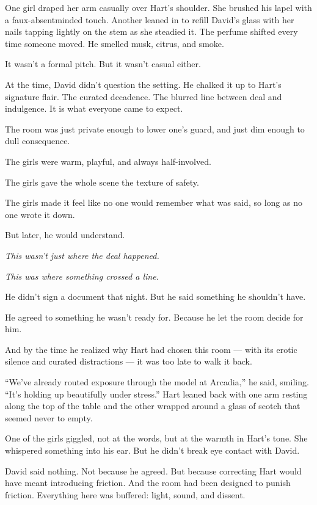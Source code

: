 \medskip


One girl draped her arm casually over Hart’s shoulder. She brushed his lapel with a faux-absentminded touch.  
Another leaned in to refill David’s glass with her nails tapping lightly on the stem as she steadied it.  
The perfume shifted every time someone moved. He smelled musk, citrus, and smoke.  

It wasn’t a formal pitch. But it wasn’t casual either.

At the time, David didn’t question the setting.  
He chalked it up to Hart’s signature flair. The curated decadence. The blurred line between deal and indulgence.
It is what everyone came to expect.  

The room was just private enough to lower one’s guard, and just dim enough to dull consequence.  

The girls were warm, playful, and always half-involved. 

The girls gave the whole scene the texture of safety.  

The girls made it feel like no one would remember what was said, so long as no one wrote it down.

But later, he would understand.

\textit{This wasn’t just where the deal happened.}  

\textit{This was where something crossed a line.}

He didn’t sign a document that night.  
But he said something he shouldn’t have.  

He agreed to something he wasn’t ready for.  
Because he let the room decide for him.

And by the time he realized why Hart had chosen this room —  
with its erotic silence and curated distractions —  
it was too late to walk it back.

“We’ve already routed exposure through the model at Arcadia,” he said, smiling. 
“It’s holding up beautifully under stress.”
Hart leaned back with one arm resting along the top of the table and the other wrapped around a 
glass of scotch that seemed never to empty. 

One of the girls giggled, not at the words, but at the warmth in Hart’s tone. She whispered something into his ear. 
But he didn’t break eye contact with David.

David said nothing. Not because he agreed. But because correcting Hart would have meant introducing friction. And the 
room had been designed to punish friction. Everything here was buffered: light, sound, and dissent.

